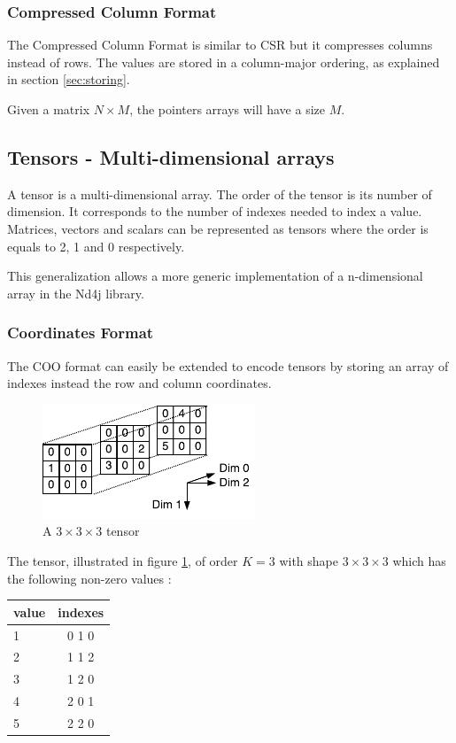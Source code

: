 \subsubsection{Compressed Column Format}
The Compressed Column Format is similar to {CSR} but it compresses columns instead of rows. The values are stored in a column-major ordering, as explained in section \ref{sec:storing}.

Given a matrix $N\times M$, the pointers arrays will have a size $M$. 
\subsection{Tensors - Multi-dimensional arrays}

A tensor is a multi-dimensional array. The order of the tensor is its number of dimension. It corresponds to the number of indexes needed to index a value. Matrices, vectors and scalars can be represented as tensors where the order is equals to 2, 1 and 0 respectively.

This generalization allows a more generic implementation of a n-dimensional array in the Nd4j library.
\subsubsection{Coordinates Format} \label{sssec:coo}
The COO format can easily be extended to encode tensors by storing an array of indexes instead the row and column coordinates. 

\begin{figure}[h]
	\begin{center}
		\includegraphics[width=2.5in]{images/tensorscooexpl.pdf} 
		\caption{A $3\times 3\times 3$ tensor}
        \label{fig:tensorCOO}
	\end{center}
\end{figure}
The tensor, illustrated in figure \ref{fig:tensorCOO}, of order $K = 3$ with shape $3\times 3 \times 3$ which has the following non-zero values :
\begin{center}
	\begin{tabular}{ l | c  }
		value & indexes\\ \hline
		1 & 0 1 0\\ \hline
		2 & 1 1 2 \\ \hline
		3 & 1 2 0 \\ \hline
		4 & 2 0 1 \\ \hline
		5 & 2 2 0 \\ 
		
	\end{tabular}
\end{center}

